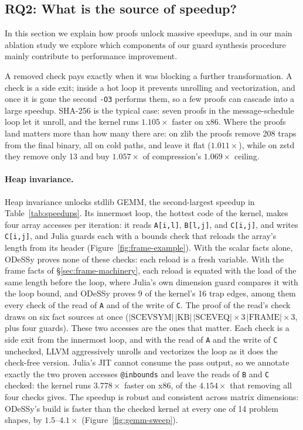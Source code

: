 \documentclass[acmsmall,screen,nonacm]{acmart}
\newcommand{\odessy}{ODeSSy}
\newcommand{\tool}{\odessy}
\begin{document}
\subsection{RQ2: What is the source of speedup?}
\label{sec:results-mech}
In this section we explain how proofs unlock massive speedups, and in our main ablation study we explore which components of our guard synthesis procedure mainly contribute to performance improvement. 

A removed check pays exactly when it was blocking a further
transformation. A check is a side exit; inside a hot loop it prevents
unrolling and vectorization, and once it is gone the second
\texttt{-O3} performs them, so a few proofs can cascade into a large
speedup. SHA-256 is the typical case: seven proofs in the
message-schedule loop let it unroll, and the kernel runs $1.105\times$
faster on x86. Where the proofs land
matters more than how many there are: on zlib the proofs remove 208
traps from the final binary, all on cold paths, and leave it flat
($1.011\times$), while on zstd they remove only 13 and buy $1.057\times$
of compression's $1.069\times$ ceiling.

\paragraph{Heap invariance.}
\label{sec:frame-results}
Heap invariance unlocks stdlib GEMM, the second-largest speedup in
Table~\ref{tab:speedups}. Its innermost loop, the hottest code of the
kernel, makes four array accesses per iteration: it reads \texttt{A[i,l]},
\texttt{B[l,j]}, and \texttt{C[i,j]}, and writes \texttt{C[i,j]}, and Julia
guards each with a bounds check that reloads the array's length from its
header (Figure~\ref{fig:frame-example}). With the scalar facts alone,
\tool{} proves none of these checks: each reload is a fresh variable. With
the frame facts of \S\ref{sec:frame-machinery}, each reload is equated
with the load of the same length before the loop, where Julia's own
dimension guard compares it with the loop bound, and \tool{} proves 9 of
the kernel's 16 trap edges, among them every check of the read of
\texttt{A} and of the write of \texttt{C}. The proof of the read's check
draws on six fact sources at once
($|\mathrm{SCEVSYM}|\,|\mathrm{KB}|\,|\mathrm{SCEVEQ}|{\times}3\,
|\mathrm{FRAME}|{\times}3$, plus four guards).
These two accesses are the ones that matter. Each check is a side exit
from the innermost loop, and with the read of \texttt{A} and the write of
\texttt{C} unchecked, LLVM aggressively unrolls and vectorizes the loop as it does the
check-free version. Julia's JIT cannot consume the pass output, so we
annotate exactly the two proven accesses \texttt{@inbounds} and leave the
reads of \texttt{B} and \texttt{C} checked: the kernel runs $3.778\times$
faster on x86, of the $4.154\times$ that removing all four checks gives.
The speedup is robust and consistent across matrix dimensions: \tool{}'s
build is faster than the checked kernel at every one of 14 problem shapes,
by $1.5$--$4.1\times$ (Figure~\ref{fig:gemm-sweep}).
\end{document}
